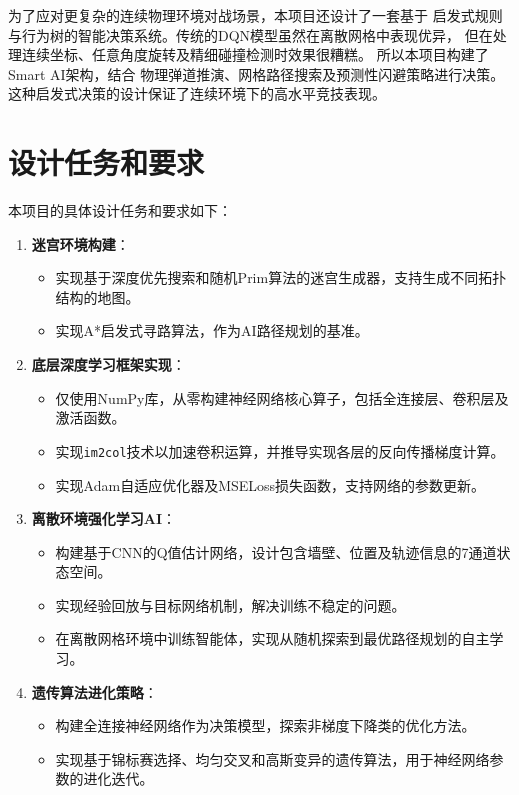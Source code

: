 \documentclass[conference]{IEEEtran}
\begin{document}
为了应对更复杂的连续物理环境对战场景，本项目还设计了一套基于
启发式规则与行为树的智能决策系统。传统的DQN模型虽然在离散网格中表现优异，
但在处理连续坐标、任意角度旋转及精细碰撞检测时效果很糟糕。
所以本项目构建了Smart AI架构，结合
物理弹道推演、网格路径搜索及预测性闪避策略进行决策。
这种启发式决策的设计保证了连续环境下的高水平竞技表现。

\section{设计任务和要求}
本项目的具体设计任务和要求如下：
\begin{enumerate}
    \item \textbf{迷宫环境构建}：
    \begin{itemize}
        \item 实现基于深度优先搜索和随机Prim算法的迷宫生成器，支持生成不同拓扑结构的地图。
        \item 实现A*启发式寻路算法，作为AI路径规划的基准。
    \end{itemize}
    
    \item \textbf{底层深度学习框架实现}：
    \begin{itemize}
        \item 仅使用NumPy库，从零构建神经网络核心算子，包括全连接层、卷积层及激活函数。
        \item 实现\texttt{im2col}技术以加速卷积运算，并推导实现各层的反向传播梯度计算。
        \item 实现Adam自适应优化器及MSELoss损失函数，支持网络的参数更新。
    \end{itemize}

    \item \textbf{离散环境强化学习AI}：
    \begin{itemize}
        \item 构建基于CNN的Q值估计网络，设计包含墙壁、位置及轨迹信息的7通道状态空间。
        \item 实现经验回放与目标网络机制，解决训练不稳定的问题。
        \item 在离散网格环境中训练智能体，实现从随机探索到最优路径规划的自主学习。
    \end{itemize}

    \item \textbf{遗传算法进化策略}：
    \begin{itemize}
        \item 构建全连接神经网络作为决策模型，探索非梯度下降类的优化方法。
        \item 实现基于锦标赛选择、均匀交叉和高斯变异的遗传算法，用于神经网络参数的进化迭代。
    \end{itemize}


\end{enumerate}
\end{document}
